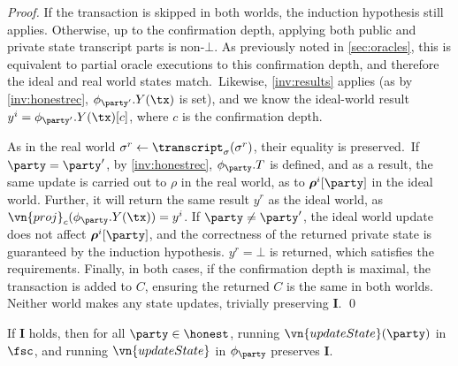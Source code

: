 \begin{proof}
  If the transaction is skipped in both worlds, the induction hypothesis still
  applies. Otherwise, up to the confirmation depth, applying both public
    and private state transcript parts is non-$\bot$. As previously
  noted in \autoref{sec:oracles}, this is equivalent to partial oracle
    executions to this confirmation depth, and therefore the ideal and real
    world states match.\ Likewise, \ref{inv:results} applies (as by \ref{inv:honestrec},
  $\phi_{\party'}.Y(\tx)$ is set), and we know the ideal-world result $y^i =
  \phi_{\party'}.Y(\tx)[c]$, where $c$ is the
    confirmation depth.

  As in the real world $\sigma^r \gets \transcript_\sigma(\sigma^r)$, their
  equality is preserved.\ If $\party = \party'$, by \ref{inv:honestrec},
  $\phi_\party.T$ is defined, and as a result, the same update is carried out to
  $\rho$ in the real world, as to $\boldsymbol\rho^i[\party]$ in the ideal
  world. Further, it will return the same result $y^r$ as the ideal world, as
  $\vn{proj}_c(\phi_\party.Y(\tx)) = y^i$. If $\party \neq \party'$, the ideal world update
  does not affect $\boldsymbol\rho^i[\party]$, and the correctness of the
  returned private state is guaranteed by the induction hypothesis. $y^r = \bot$
  is returned, which satisfies the requirements. Finally, in both cases,
  if the confirmation depth is maximal, the transaction is added to $C$, ensuring the returned $C$ is
  the same in both worlds. Neither world makes any state updates, trivially
  preserving $\boldsymbol I$.
  \qed
\end{proof}

\begin{lemma}
  \sloppy
  If $\boldsymbol I$ holds, then for all $\party \in \honest$, running
  $\vn{updateState}(\party)$ in $\fsc$, and running $\vn{updateState}$
  in $\phi_\party$ preserves $\boldsymbol I$.
  \label{lem:updatestate}
\end{lemma}

